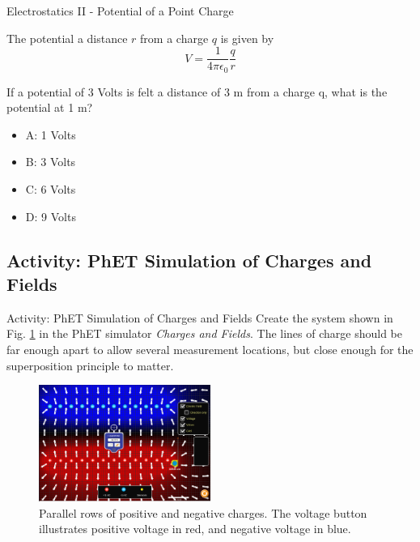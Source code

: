 \documentclass{beamer}
\begin{document}
\begin{frame}{Electrostatics II - Potential of a Point Charge}
\begin{tcolorbox}[colback=white,colframe=gray,title=Potential of a Point Charge]
The potential a distance $r$ from a charge $q$ is given by
\begin{equation}
\boxed{
V = \frac{1}{4\pi \epsilon_0} \frac{q}{r}}
\end{equation}
\end{tcolorbox}
If a potential of 3 Volts is felt a distance of 3 m from a charge q, what is the potential at 1 m?
\begin{itemize}
\item A: 1 Volts
\item B: 3 Volts
\item C: 6 Volts
\item D: 9 Volts
\end{itemize}
\end{frame}

\subsection{Activity: PhET Simulation of Charges and Fields}

\begin{frame}{Activity: PhET Simulation of Charges and Fields}
Create the system shown in Fig. \ref{fig:cap_phet} in the PhET simulator \textit{Charges and Fields}.  The lines of charge should be far enough apart to allow several measurement locations, but close enough for the superposition principle to matter.
\begin{figure}
\centering
\includegraphics[width=0.5\textwidth]{figures/cap.png}
\caption{\label{fig:cap_phet} Parallel rows of positive and negative charges.  The voltage button illustrates positive voltage in red, and negative voltage in blue.}
\end{figure}
\end{frame}
\end{document}
